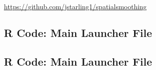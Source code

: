 \documentclass[11pt]{article}
\newcommand{\myindent}{\hspace*{1cm}}
\begin{document}
\myindent \underline{https://github.com/jstarling1/spatialsmoothing}

\subsection{R Code: Main Launcher File}


\subsection{R Code: Main Launcher File}


% 
% 
% 
% 
% 
\end{document}
